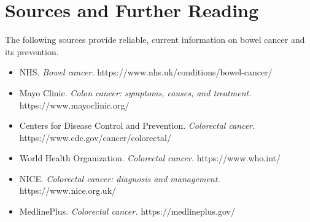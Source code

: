 \section*{Sources and Further Reading}
The following sources provide reliable, current information on bowel cancer and its prevention.
\begin{itemize}
    \item NHS. \textit{Bowel cancer.} https://www.nhs.uk/conditions/bowel-cancer/
    \item Mayo Clinic. \textit{Colon cancer: symptoms, causes, and treatment.} https://www.mayoclinic.org/
    \item Centers for Disease Control and Prevention. \textit{Colorectal cancer.} https://www.cdc.gov/cancer/colorectal/
    \item World Health Organization. \textit{Colorectal cancer.} https://www.who.int/
    \item NICE. \textit{Colorectal cancer: diagnosis and management.} https://www.nice.org.uk/
    \item MedlinePlus. \textit{Colorectal cancer.} https://medlineplus.gov/
\end{itemize}
